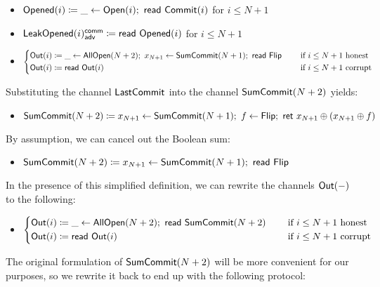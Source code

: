 \begin{itemize}
\item {\color{red} $\mathsf{Opened}(i) \coloneqq \_ \leftarrow \mathsf{Open}(i); \ \mathsf{read} \ \mathsf{Commit}(i)$ for $i \leq N+1$}
\item {\color{red} $\mathsf{LeakOpened}(i)^{\mathsf{comm}}_{\mathsf{adv}} \coloneqq \mathsf{read} \ \mathsf{Opened}(i)$ for $i \leq N+1$}
\item $\begin{cases*} \Out(i) \coloneqq \_ \leftarrow \AllOpen(N+2); \ x_{N+1} \leftarrow \SumCommit(N+1); \ \read{\Flip} & \hspace{10pt} \text{if $i \leq N+1$ honest} \\ \Out(i) \coloneqq \read{\Out(i)} & \hspace{10pt} \text{if $i \leq N+1$ corrupt} \end{cases*}$
\end{itemize}

\noindent Substituting the channel $\mathsf{LastCommit}$ into the channel $\mathsf{SumCommit}(N+2)$ yields:

\begin{itemize}
\item $\mathsf{SumCommit}(N+2) \coloneqq x_{N+1} \leftarrow \mathsf{SumCommit}(N+1); \ f \leftarrow \mathsf{Flip}; \ \mathsf{ret} \ x_{N+1} \oplus (x_{N+1} \oplus f)$
\end{itemize}

\noindent By assumption, we can cancel out the Boolean sum:

\begin{itemize}
\item $\mathsf{SumCommit}(N+2) \coloneqq x_{N+1} \leftarrow \mathsf{SumCommit}(N+1);
\ \mathsf{read} \ \mathsf{Flip}$
\end{itemize}

\noindent In the presence of this simplified definition, we can rewrite the channels $\mathsf{Out}(-)$ to the following:

\begin{itemize}
\item $\begin{cases*} \Out(i) \coloneqq \_ \leftarrow \AllOpen(N+2); \ \read{\SumCommit(N+2)} & \hspace{10pt} \text{if $i \leq N+1$ honest} \\ \Out(i) \coloneqq \read{\Out(i)} & \hspace{10pt} \text{if $i \leq N+1$ corrupt} \end{cases*}$
\end{itemize}

\noindent The original formulation of $\mathsf{SumCommit}(N+2)$ will be more convenient for our purposes, so we rewrite it back to end up with the following protocol:


